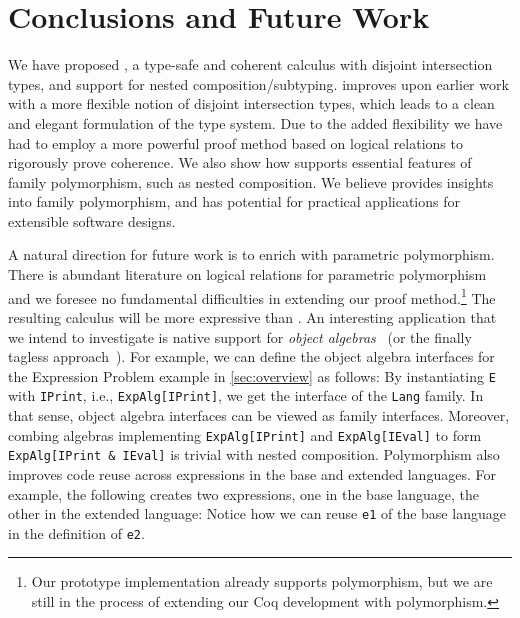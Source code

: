 
\section{Conclusions and Future Work}
\label{sec:conclusion}

We have proposed \name, a type-safe and coherent calculus with disjoint
intersection types, and support for nested composition/subtyping. \name
improves upon earlier work with a more
flexible notion of disjoint intersection types, which leads to
a clean and elegant formulation of the type system. Due to the added
flexibility we have had to employ a more powerful proof method based on logical
relations to rigorously prove coherence.
We also show how \name supports essential features of family
polymorphism, such as nested composition. We believe \name provides insights into family polymorphism, and
has potential for practical applications for extensible software designs.

A natural direction for future work is to enrich \name with parametric
polymorphism. There is abundant literature on logical relations for parametric
polymorphism~\citep{reynolds1983types} and we foresee no fundamental
difficulties in extending our proof method.\footnote{
Our prototype
  implementation already supports polymorphism, but we
  are still in the process of extending our Coq development with polymorphism. } The resulting calculus will be
more expressive than \fname. An interesting application that we intend to investigate
is native support for \textit{object algebras}~\citep{oliveira2012extensibility}
(or the finally tagless approach~\citep{CARETTE_2009}). For example, we can
define the object algebra interfaces for the Expression Problem example in
\cref{sec:overview} as follows:
By instantiating \lstinline{E} with \lstinline{IPrint}, i.e.,
\lstinline{ExpAlg[IPrint]}, we get the interface of the \lstinline{Lang} family.
In that sense, object algebra interfaces can be viewed as family interfaces.
Moreover, combing algebras implementing \lstinline{ExpAlg[IPrint]} and
\lstinline{ExpAlg[IEval]} to form \lstinline{ExpAlg[IPrint & IEval]} is trivial
with nested composition. Polymorphism also improves code reuse across expressions in the
base and extended languages. For example, the following creates two expressions,
one in the base language, the other in the extended language:
Notice how we can  reuse \lstinline{e1} of the base language in the definition
of \lstinline{e2}.





